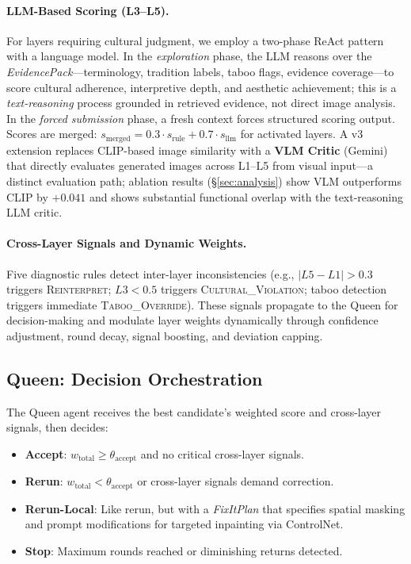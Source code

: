 \documentclass[sigconf, screen, review, anonymous]{acmart}
\newcommand{\Lx}[1]{L#1}
\begin{document}
\paragraph{LLM-Based Scoring (\Lx{3}--\Lx{5}).}
For layers requiring cultural judgment, we employ a two-phase ReAct pattern with a language model.
In the \emph{exploration} phase, the LLM reasons over the \emph{EvidencePack}---terminology, tradition labels, taboo flags, evidence coverage---to score cultural adherence, interpretive depth, and aesthetic achievement; this is a \emph{text-reasoning} process grounded in retrieved evidence, not direct image analysis.
In the \emph{forced submission} phase, a fresh context forces structured scoring output.
Scores are merged: $s_{\text{merged}} = 0.3 \cdot s_{\text{rule}} + 0.7 \cdot s_{\text{llm}}$ for activated layers.
A v3 extension replaces CLIP-based image similarity with a \textbf{VLM Critic} (Gemini) that directly evaluates generated images across \Lx{1}--\Lx{5} from visual input---a distinct evaluation path; ablation results (\S\ref{sec:analysis}) show VLM outperforms CLIP by $+0.041$ and shows substantial functional overlap with the text-reasoning LLM critic.

\paragraph{Cross-Layer Signals and Dynamic Weights.}
Five diagnostic rules detect inter-layer inconsistencies (e.g., $|\Lx{5} - \Lx{1}| > 0.3$ triggers \textsc{Reinterpret}; $\Lx{3} < 0.5$ triggers \textsc{Cultural\_Violation}; taboo detection triggers immediate \textsc{Taboo\_Override}).
These signals propagate to the Queen for decision-making and modulate layer weights dynamically through confidence adjustment, round decay, signal boosting, and deviation capping.

\subsection{Queen: Decision Orchestration}
\label{sec:queen}

The Queen agent receives the best candidate's weighted score and cross-layer signals, then decides:

\begin{itemize}
    \item \textbf{Accept}: $w_{\text{total}} \geq \theta_{\text{accept}}$ and no critical cross-layer signals.
    \item \textbf{Rerun}: $w_{\text{total}} < \theta_{\text{accept}}$ or cross-layer signals demand correction.
    \item \textbf{Rerun-Local}: Like rerun, but with a \emph{FixItPlan} that specifies spatial masking and prompt modifications for targeted inpainting via ControlNet.
    \item \textbf{Stop}: Maximum rounds reached or diminishing returns detected.
\end{itemize}
\end{document}
